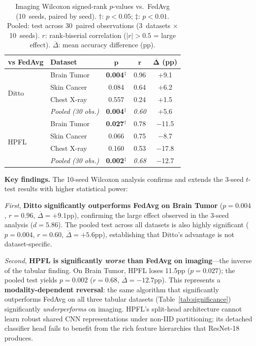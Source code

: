 \documentclass[conference]{IEEEtran}
\begin{document}
\begin{table}[htbp]
\centering
\caption{Imaging Wilcoxon signed-rank $p$-values vs.\ FedAvg (10~seeds, paired by seed). $\dagger$: $p < 0.05$; $\ddagger$: $p < 0.01$. Pooled: test across 30~paired observations (3~datasets $\times$ 10~seeds). $r$: rank-biserial correlation ($|r| > 0.5$ = large effect). $\overline{\Delta}$: mean accuracy difference (pp).}
\label{tab:imaging_wilcoxon}
\small
\begin{tabular}{llccc}
\toprule
\textbf{vs FedAvg} & \textbf{Dataset} & $\boldsymbol{p}$ & $\boldsymbol{r}$ & $\boldsymbol{\overline{\Delta}}$ \textbf{(pp)} \\
\midrule
\multirow{4}{*}{Ditto} & Brain Tumor & \textbf{0.004}$^\ddagger$ & 0.96 & $+$9.1 \\
 & Skin Cancer & 0.084 & 0.64 & $+$6.2 \\
 & Chest X-ray & 0.557 & 0.24 & $+$1.5 \\
 & \textit{Pooled (30 obs.)} & \textbf{0.004}$^\ddagger$ & \textit{0.60} & $+$5.6 \\
\midrule
\multirow{4}{*}{HPFL} & Brain Tumor & \textbf{0.027}$^\dagger$ & 0.78 & $-$11.5 \\
 & Skin Cancer & 0.066 & 0.75 & $-$8.7 \\
 & Chest X-ray & 0.160 & 0.53 & $-$17.8 \\
 & \textit{Pooled (30 obs.)} & \textbf{0.002}$^\ddagger$ & \textit{0.68} & $-$12.7 \\
\bottomrule
\end{tabular}
\end{table}

\textbf{Key findings.} The 10-seed Wilcoxon analysis confirms and extends the 3-seed $t$-test results with higher statistical power:

\textit{First}, \textbf{Ditto significantly outperforms FedAvg on Brain Tumor} ($p{=}0.004$, $r{=}0.96$, $\overline{\Delta}{=}{+}9.1$pp), confirming the large effect observed in the 3-seed analysis ($d{=}5.86$). The pooled test across all datasets is also highly significant ($p{=}0.004$, $r{=}0.60$, $\overline{\Delta}{=}{+}5.6$pp), establishing that Ditto's advantage is not dataset-specific.

\textit{Second}, \textbf{HPFL is significantly \textit{worse} than FedAvg on imaging}---the inverse of the tabular finding. On Brain Tumor, HPFL loses 11.5pp ($p{=}0.027$); the pooled test yields $p{=}0.002$ ($r{=}0.68$, $\overline{\Delta}{=}{-}12.7$pp). This represents a \textbf{modality-dependent reversal}: the same algorithm that significantly outperforms FedAvg on all three tabular datasets (Table~\ref{tab:significance}) significantly \textit{underperforms} on imaging. HPFL's split-head architecture cannot learn robust shared CNN representations under non-IID partitioning; its detached classifier head fails to benefit from the rich feature hierarchies that ResNet-18 produces.
\end{document}
